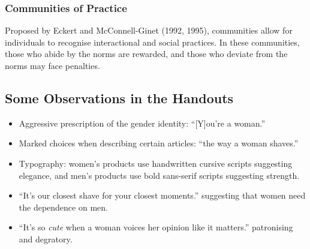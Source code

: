\documentclass[../main.tex]{subfiles}
\begin{document}
            \subsubsection{Communities of Practice}
            Proposed by Eckert and McConnell-Ginet (1992, 1995), communities allow for individuals to recognise interactional and social practices. In these communities, those who abide by the norms are rewarded, and those who deviate from the norms may face penalties. 

        \subsection{Some Observations in the Handouts}
        \begin{itemize}
            \item Aggressive prescription of the gender identity: ``[Y]ou're a woman.''
            \item Marked choices when describing certain articles: ``the way a woman shaves.''
            \item Typography: women's products use handwritten cursive scripts suggesting elegance, and men's products use bold sans-serif scripts suggesting strength.
            \item ``It's our closest shave for your closest moments.'' suggesting that women need the dependence on men.
            \item ``It's so \textit{cute} when a woman voices her opinion like it matters.'' patronising and degratory.
        \end{itemize}
\end{document}
